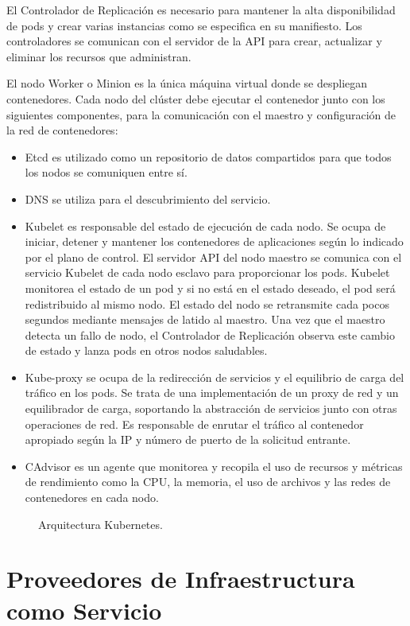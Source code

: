 El Controlador de Replicación es necesario para mantener la alta disponibilidad de pods y crear varias instancias como se especifica en su manifiesto. Los controladores se comunican con el servidor de la API para crear, actualizar y eliminar los recursos que administran. 

El nodo Worker o Minion es la única máquina virtual donde se despliegan contenedores. Cada nodo del clúster debe ejecutar el contenedor junto con los siguientes componentes, para la comunicación con el maestro y configuración de la red de contenedores:
\begin{itemize}
\item Etcd es utilizado como un repositorio de datos compartidos para que todos los nodos se comuniquen entre sí.
\item DNS se utiliza para el descubrimiento del servicio.
\item Kubelet es responsable del estado de ejecución de cada nodo. Se ocupa de iniciar, detener y mantener los contenedores de aplicaciones según lo indicado por el plano de control. El servidor API del nodo maestro se comunica con el servicio Kubelet de cada nodo esclavo para proporcionar los pods. Kubelet monitorea el estado de un pod y si no está en el estado deseado, el pod será redistribuido al mismo nodo. El estado del nodo se retransmite cada pocos segundos mediante mensajes de latido al maestro. Una vez que el maestro detecta un fallo de nodo, el Controlador de Replicación observa este cambio de estado y lanza pods en otros nodos saludables.
\item Kube-proxy se ocupa de la redirección de servicios y el equilibrio de carga del tráfico en los pods. Se trata de una implementación de un proxy de red y un equilibrador de carga, soportando la abstracción de servicios junto con otras operaciones de red. Es responsable de enrutar el tráfico al contenedor apropiado según la IP y número de puerto de la solicitud entrante.
\item CAdvisor es un agente que monitorea y recopila el uso de recursos y métricas de rendimiento como la CPU, la memoria, el uso de archivos y las redes de contenedores en cada nodo.
\end{itemize}

\begin{figure}[H]
\caption{Arquitectura Kubernetes.\label{fig:figure_placement_example}}
\end{figure}

\section{Proveedores de Infraestructura como Servicio}

